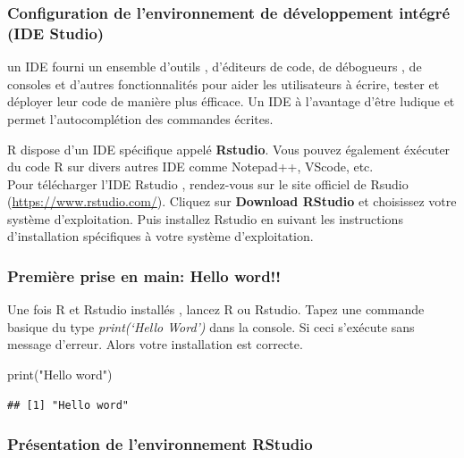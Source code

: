 \documentclass[
]{article}
\newenvironment{Shaded}{\begin{snugshade}}{\end{snugshade}}
\newcommand{\FunctionTok}[1]{\textcolor[rgb]{0.00,0.00,0.00}{#1}}
\newcommand{\NormalTok}[1]{#1}
\newcommand{\StringTok}[1]{\textcolor[rgb]{0.31,0.60,0.02}{#1}}
\begin{document}
\hypertarget{configuration-de-lenvironnement-de-duxe9veloppement-intuxe9gruxe9-ide-studio}{%
\subsubsection{Configuration de l'environnement de développement intégré
(IDE
Studio)}\label{configuration-de-lenvironnement-de-duxe9veloppement-intuxe9gruxe9-ide-studio}}

un IDE fourni un ensemble d'outils , d'éditeurs de code, de débogueurs ,
de consoles et d'autres fonctionnalités pour aider les utilisateurs à
écrire, tester et déployer leur code de manière plus éfficace. Un IDE à
l'avantage d'être ludique et permet l'autocomplétion des commandes
écrites.

R dispose d'un IDE spécifique appelé \textbf{Rstudio}. Vous pouvez
également éxécuter du code R sur divers autres IDE comme Notepad++,
VScode, etc.\\
Pour télécharger l'IDE Rstudio , rendez-vous sur le site officiel de
Rsudio (\url{https://www.rstudio.com/}). Cliquez sur \textbf{Download
RStudio} et choisissez votre système d'exploitation. Puis installez
Rstudio en suivant les instructions d'installation spécifiques à votre
système d'exploitation.

\hypertarget{premiuxe8re-prise-en-main-hello-word}{%
\subsubsection{Première prise en main: Hello
word!!}\label{premiuxe8re-prise-en-main-hello-word}}

Une fois R et Rstudio installés , lancez R ou Rstudio. Tapez une
commande basique du type \emph{print(`Hello Word')} dans la console. Si
ceci s'exécute sans message d'erreur. Alors votre installation est
correcte.

\begin{Shaded}
\begin{Highlighting}[]
\FunctionTok{print}\NormalTok{(}\StringTok{"Hello word"}\NormalTok{)}
\end{Highlighting}
\end{Shaded}

\begin{verbatim}
## [1] "Hello word"
\end{verbatim}

\hypertarget{pruxe9sentation-de-lenvironnement-rstudio}{%
\subsubsection{Présentation de l'environnement
RStudio}\label{pruxe9sentation-de-lenvironnement-rstudio}}
\end{document}
